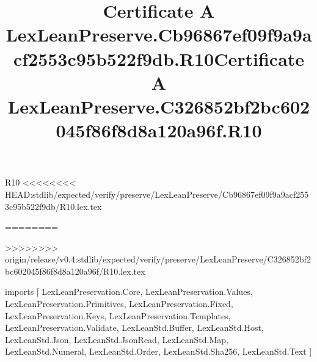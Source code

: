 \begin{lexlean}{R10}
<<<<<<<< HEAD:stdlib/expected/verify/preserve/LexLeanPreserve/Cb96867ef09f9a9acf2553c95b522f9db/R10.lex.tex
\title{Certificate A LexLeanPreserve.Cb96867ef09f9a9acf2553c95b522f9db.R10}
========
\title{Certificate A LexLeanPreserve.C326852bf2bc602045f86f8d8a120a96f.R10}
>>>>>>>> origin/release/v0.4:stdlib/expected/verify/preserve/LexLeanPreserve/C326852bf2bc602045f86f8d8a120a96f/R10.lex.tex
\begin{coremodule}
imports [
  LexLeanPreservation.Core,
  LexLeanPreservation.Values,
  LexLeanPreservation.Primitives,
  LexLeanPreservation.Fixed,
  LexLeanPreservation.Keys,
  LexLeanPreservation.Templates,
  LexLeanPreservation.Validate,
  LexLeanStd.Buffer,
  LexLeanStd.Host,
  LexLeanStd.Json,
  LexLeanStd.JsonRead,
  LexLeanStd.Map,
  LexLeanStd.Numeral,
  LexLeanStd.Order,
  LexLeanStd.Sha256,
  LexLeanStd.Text
]


\end{coremodule}
\end{lexlean}

